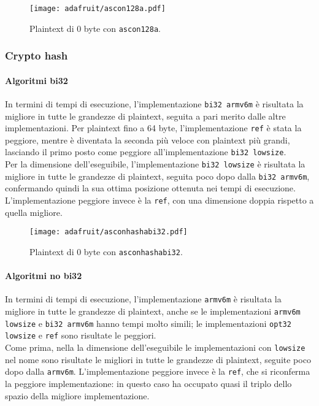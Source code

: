 \begin{figure}[H]
    \centering
    \texttt{[image: adafruit/ascon128a.pdf]}
    \caption{Plaintext di 0 byte con \texttt{ascon128a}.}
\end{figure}

\subsubsection{Crypto hash}

\paragraph{Algoritmi bi32}

In termini di tempi di esecuzione, l'implementazione \texttt{bi32 armv6m} è risultata la migliore in tutte le grandezze di plaintext, seguita a pari merito dalle altre implementazioni. Per plaintext fino a 64 byte, l'implementazione \texttt{ref} è stata la peggiore, mentre è diventata la seconda più veloce con plaintext più grandi, lasciando il primo posto come peggiore all'implementazione \texttt{bi32 lowsize}. \\

\noindent Per la dimensione dell'eseguibile, l'implementazione \texttt{bi32 lowsize} è risultata la migliore in tutte le grandezze di plaintext, seguita poco dopo dalla \texttt{bi32 armv6m}, confermando quindi la sua ottima posizione ottenuta nei tempi di esecuzione. L'implementazione peggiore invece è la \texttt{ref}, con una dimensione doppia rispetto a quella migliore.

\begin{figure}[H]
    \centering
    \texttt{[image: adafruit/asconhashabi32.pdf]}
    \caption{Plaintext di 0 byte con \texttt{asconhashabi32}.}
\end{figure}

\paragraph{Algoritmi no bi32}

In termini di tempi di esecuzione, l'implementazione \texttt{armv6m} è risultata la migliore in tutte le grandezze di plaintext, anche se le implementazioni \texttt{armv6m lowsize} e \texttt{bi32 armv6m} hanno tempi molto simili; le implementazioni \texttt{opt32 lowsize} e \texttt{ref} sono risultate le peggiori. \\

\noindent Come prima, nella la dimensione dell'eseguibile le implementazioni con \texttt{lowsize} nel nome sono risultate le migliori in tutte le grandezze di plaintext, seguite poco dopo dalla \texttt{armv6m}. L'implementazione peggiore invece è la \texttt{ref}, che si riconferma la peggiore implementazione: in questo caso ha occupato quasi il triplo dello spazio della migliore implementazione.

